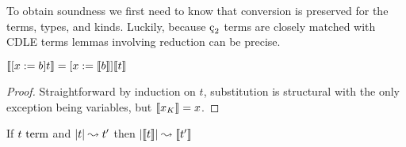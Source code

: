 To obtain soundness we first need to know that conversion is preserved for the terms, types, and kinds.
Luckily, because $\ced$ terms are closely matched with CDLE terms lemmas involving reduction can be precise.

\begin{lemma}
    \label{lem:4:sema_subst}
    $\llbracket [x := b]t \rrbracket = [x := \llbracket b \rrbracket]\llbracket t \rrbracket$
\end{lemma}
\begin{proof}
    Straightforward by induction on $t$, substitution is structural with the only exception being variables, but $\llbracket x_K \rrbracket = x$.
\end{proof}

\begin{lemma}
    \label{lem:4:sema_term_step}
    If $t~\textnormal{term}$ and $|t| \leadsto t^\prime$ then $|\llbracket t \rrbracket| \leadsto \llbracket t^\prime \rrbracket$
\end{lemma}
